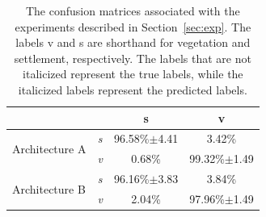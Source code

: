 \documentclass{article}
\begin{document}
\label{sec:results}
\begin{table}
\begin{tabular}{ |l|c c c| }
\hline
& & s & v\\
\hline
\multirow{2}{*}{Architecture A} & \emph{s} & 96.58\%$\pm$4.41&3.42\%\\
& \emph{v}& 0.68\%& 99.32\%$\pm$1.49\\
\hline
\multirow{2}{*}{Architecture B} & \emph{s} & 96.16\%$\pm$3.83&3.84\%\\
& \emph{v}& 2.04\%& 97.96\%$\pm$1.49\\
\hline
\end{tabular}
\caption{The confusion matrices associated with the experiments described in Section~\ref{sec:exp}. The labels v and s are shorthand for vegetation and settlement, respectively. The labels that are not italicized represent the true labels, while the italicized labels represent the predicted labels.}
\label{tab:cm}
\end{table}

\end{document}
